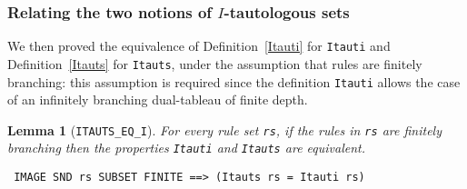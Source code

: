 \documentclass[a4paper]{article}
\newtheorem{lemma}{Lemma}
\newtheorem{definition}{Definition}
\newcommand{\hol}{\texttt{HOL4}}
\begin{document}

\subsubsection{Relating the two notions of $I$-tautologous sets}
\label{Itauti-Itauts}

We then proved the equivalence of 
Definition~\ref{Itauti} for \texttt{Itauti} and
Definition~\ref{Itauts} for \texttt{Itauts},
under the assumption that rules are finitely branching:
this assumption is required since the definition \texttt{Itauti}
allows the case of an infinitely branching dual-tableau of finite depth.

\begin{lemma}[\texttt{ITAUTS\_EQ\_I}] \label{ITAUTS-EQ-I}
For every rule set \texttt{rs},
if the rules in \texttt{rs} are finitely branching then
the properties \texttt{Itauti} and \texttt{Itauts} are equivalent.
\end{lemma}
\begin{verbatim}
 IMAGE SND rs SUBSET FINITE ==> (Itauts rs = Itauti rs)
\end{verbatim}
  
\end{document}
